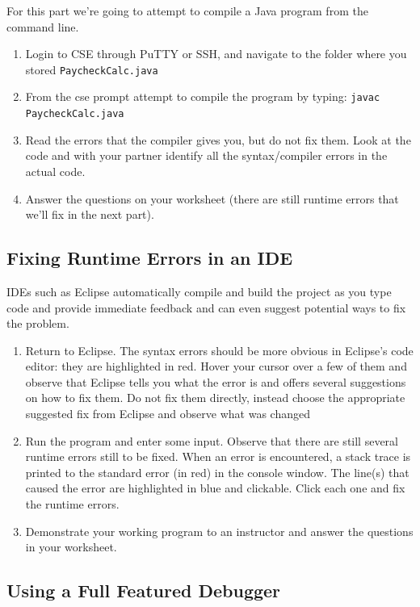 \documentclass[12pt]{scrartcl}
\begin{document}
For this part we're going to attempt to compile a Java program from the 
command line.
\begin{enumerate}
  \item Login to CSE through PuTTY or SSH, and navigate to the folder where 
  	you stored \texttt{PaycheckCalc.java}
  \item From the cse prompt attempt to compile the program by typing:
	\texttt{javac PaycheckCalc.java}
  \item Read the errors that the compiler gives you, but do not fix them.  
	Look at the code and with your partner identify all the syntax/compiler
	errors in the actual code.
  \item Answer the questions on your worksheet (there are still runtime errors 
	that we'll fix in the next part).
\end{enumerate}
	
\subsection{Fixing Runtime Errors in an IDE}

IDEs such as Eclipse automatically compile and build the project as you type 
code and provide immediate feedback and can even suggest potential ways 
to fix the problem. 

\begin{enumerate}
  \item Return to Eclipse.  The syntax errors should be more obvious in Eclipse's code editor: 
  	they are highlighted in red.  Hover your cursor over a few of them and 
	observe that Eclipse tells you what the error is and offers several 
	suggestions on how to fix them.  Do not fix them directly, instead choose 
	the appropriate suggested fix from Eclipse and observe what was changed	
  \item Run the program and enter some input.  Observe that there are still several 
  	runtime errors still to be fixed.   When an error is encountered, a stack trace is 
	printed to the standard error (in red) in the console window.  The line(s) that 
	caused the error are highlighted in blue and clickable.  Click each one and fix 
	the runtime errors.
  \item Demonstrate your working program to an instructor and answer the questions in your worksheet.
\end{enumerate}

\subsection{Using a Full Featured Debugger}
\end{document}

